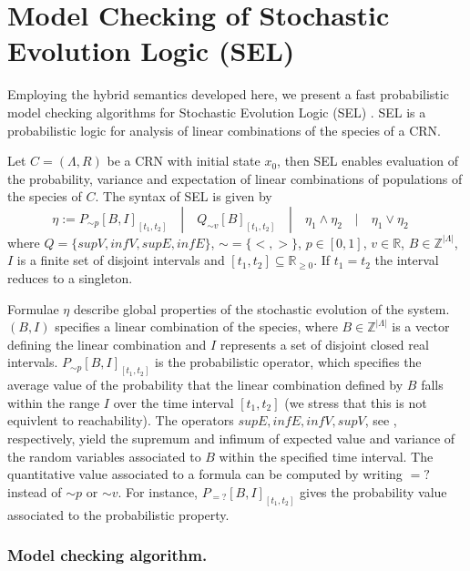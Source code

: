 \documentclass{llncs}
\begin{document}
\section{Model Checking of Stochastic Evolution Logic (SEL)}\label{logic-sec}

Employing the hybrid semantics developed here, we present a fast probabilistic model checking algorithms for Stochastic Evolution Logic (SEL) \cite{cardelli2015stochastic}. SEL is a probabilistic logic for analysis of linear combinations of the species of a CRN.

Let $C = (\Lambda,R)$ be a CRN with initial state $x_0$, then SEL enables evaluation of the probability, variance and expectation of linear combinations of populations of the species of $C$.
The syntax of SEL is given by 
\[
\eta := P_{\sim p}[ B,I]_{[t_1,t_2]} \quad | \quad Q_{\sim v}[B]_{[t_1,t_2]} \quad |\quad \eta_1 \wedge \eta_2 \quad  | \quad \eta_1 \vee \eta_2 \quad
\]
\noindent
where $Q=\{supV, infV,supE,infE\}$, $\sim=\{<,>\}$, $p \in [0,1]$, $v \in \mathbb{R}$, $B \in \mathbb{Z}^{|\Lambda|}$, $I$ is a finite set of disjoint intervals and $[t_1,t_2] \subseteq \mathbb{R}_{\geq 0}$. If $t_1=t_2$ the interval reduces to a singleton.

Formulae $\eta$ describe global properties of the stochastic evolution of the system. 
$(B,I)$ specifies a linear combination of the species, %
where $B \in \mathbb{Z}^{|\Lambda|}$ is a vector defining the linear combination and $I$ represents a set of disjoint closed real intervals. $P_{\sim p}[ B,I]_{[t_1,t_2]}$ is the probabilistic operator, which specifies the average value of the probability that the linear combination defined by $B$ falls within the range $I$ over the time interval $[t_1,t_2]$ (we stress that this is not equivlent to reachability). 
The operators $supE,infE,infV,supV$, see \cite{cardelli2015stochastic}, respectively, yield the supremum and infimum of expected value and variance of the random variables associated to $B$ within the specified time interval. The quantitative value associated to a formula can be computed by writing $=?$ instead of $\sim p$ or $\sim v$. For instance, $P_{=?}[ B,I]_{[t_1,t_2]}$ gives the probability value associated to the probabilistic property.

\subsubsection{Model checking algorithm.}
\end{document}

